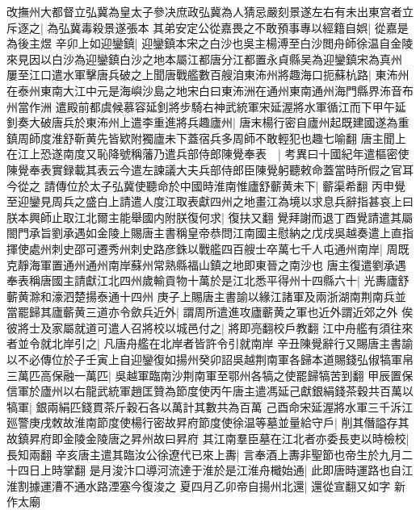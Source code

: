 改撫州大都督立弘冀為皇太子參决庶政弘冀為人猜忌嚴刻景遂左右有未出東宫者立斥逐之|{
	為弘冀毒殺景遂張本}
其弟安定公從嘉畏之不敢預事專以經籍自娯|{
	從嘉是為後主煜}
辛卯上如迎鑾鎮|{
	迎鑾鎮本宋之白沙也吳主楊溥至白沙閲舟師徐温自金陵來見因以白沙為迎鑾鎮白沙之地本屬江都唐分江都置永貞縣吴為迎鑾鎮宋為真州}
屢至江口遣水軍擊唐兵破之上聞唐戰艦數百艘洎東㳍州將趣海口扼蘇杭路|{
	東㳍州在泰州東南大江中元是海嶼沙島之地宋白曰東㳍洲在通州東南通州海門縣界㳍音布州當作洲}
遣殿前都虞候慕容延釗將步騎右神武統軍宋延渥將水軍循江而下甲午延釗奏大破唐兵於東㳍州上遣李重進將兵趣廬州|{
	唐末楊行密自廬州起既建國遂為重鎮周師度淮舒靳黄先皆欵附獨廬未下蓋宿兵多周師不敢輕犯也趣七喻翻}
唐主聞上在江上恐遂南度又恥降號稱藩乃遣兵部侍郎陳覺奉表　|{
	考異曰十國紀年遣樞密使陳覺奉表實録載其表云今遣左諫議大夫兵部侍郎臣陳覺躬聽敕命蓋當時所假之官耳今從之}
請傳位於太子弘冀使聽命於中國時淮南惟廬舒蘄黄未下|{
	蘄渠希翻}
丙申覺至迎鑾見周兵之盛白上請遣人度江取表獻四州之地畫江為境以求息兵辭指甚哀上曰朕本興師止取江北爾主能舉國内附朕復何求|{
	復扶又翻}
覺拜謝而退丁酉覺請遣其屬閤門承旨劉承遇如金陵上賜唐主書稱皇帝恭問江南國主慰納之戊戌吳越奏遣上直指揮使處州刺史邵可遷秀州刺史路彦銖以戰艦四百艘士卒萬七千人屯通州南岸|{
	周既克靜海軍置通州通州南岸蘇州常熟縣福山鎮之地即東晉之南沙也}
唐主復遣劉承遇奉表稱唐國主請獻江北四州歲輸貢物十萬於是江北悉平得州十四縣六十|{
	光夀廬舒蘄黄滁和濠泗楚揚泰通十四州}
庚子上賜唐主書諭以緣江諸軍及兩浙湖南荆南兵並當罷歸其廬蘄黄三道亦令歛兵近外|{
	謂周所遣進攻廬蘄黄之軍也近外謂近郊之外}
俟彼將士及家屬就道可遣人召將校以城邑付之|{
	將即亮翻校戶教翻}
江中舟艦有須往來者並令就北岸引之|{
	凡唐舟艦在北岸者皆許令引就南岸}
辛丑陳覺辭行又賜唐主書諭以不必傳位於子壬寅上自迎鑾復如揚州癸卯詔吳越荆南軍各歸本道賜錢弘俶犒軍帛三萬匹高保融一萬匹|{
	吳越軍臨南沙荆南軍至鄂州各犒之使罷歸犒苦到翻}
甲辰置保信軍於廬州以右龍武統軍趙匡贊為節度使丙午唐主遣馮延己獻銀絹錢茶穀共百萬以犒軍|{
	銀兩絹匹錢貫茶斤穀石各以萬計其數共為百萬}
己酉命宋延渥將水軍三千泝江廵警庚戌敇故淮南節度使楊行密故昇府節度使徐温等墓並量給守戶|{
	削其僭謚存其故鎮昇府即金陵金陵唐之昇州故曰昇府}
其江南羣臣墓在江北者亦委長吏以時檢校|{
	長知兩翻}
辛亥唐主遣其臨汝公徐遼代已來上夀|{
	言奉酒上夀非聖節也帝生於九月二十四日上時掌翻}
是月浚汴口導河流達于淮於是江淮舟檝始通|{
	此即唐時運路也自江淮割據運漕不通水路湮塞今復浚之}
夏四月乙卯帝自揚州北還|{
	還從宣翻又如字}
新作太廟

